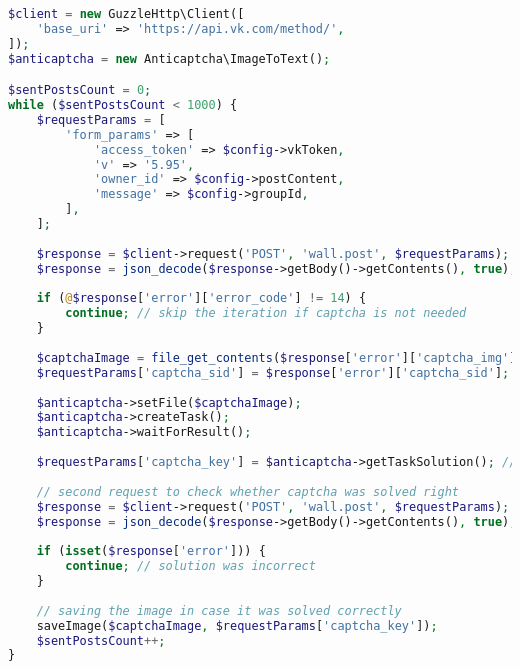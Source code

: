 \begin{lstlisting}[language=PHP,basicstyle=\fontsize{11}{11}\selectfont,tabsize=4,breaklines=true,caption={Скрипт для получения и сохранения решений captcha.},captionpos=b,label={lst:captcha-gatherer}]
$client = new GuzzleHttp\Client([
	'base_uri' => 'https://api.vk.com/method/',
]);
$anticaptcha = new Anticaptcha\ImageToText();

$sentPostsCount = 0;
while ($sentPostsCount < 1000) {
	$requestParams = [
		'form_params' => [
			'access_token' => $config->vkToken,
			'v' => '5.95',
			'owner_id' => $config->postContent,
			'message' => $config->groupId,
		],
	];
	
	$response = $client->request('POST', 'wall.post', $requestParams);
	$response = json_decode($response->getBody()->getContents(), true);
	
	if (@$response['error']['error_code'] != 14) {
		continue; // skip the iteration if captcha is not needed
	}
	
	$captchaImage = file_get_contents($response['error']['captcha_img']); // loading a captcha image
	$requestParams['captcha_sid'] = $response['error']['captcha_sid'];
	
	$anticaptcha->setFile($captchaImage);
	$anticaptcha->createTask();
	$anticaptcha->waitForResult();
	
	$requestParams['captcha_key'] = $anticaptcha->getTaskSolution(); // getting solution
	
	// second request to check whether captcha was solved right
	$response = $client->request('POST', 'wall.post', $requestParams);
	$response = json_decode($response->getBody()->getContents(), true);
	
	if (isset($response['error'])) {
		continue; // solution was incorrect
	}
	
	// saving the image in case it was solved correctly
	saveImage($captchaImage, $requestParams['captcha_key']);
	$sentPostsCount++;
}
\end{lstlisting}
